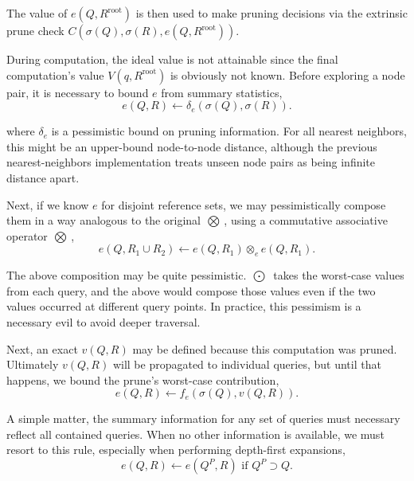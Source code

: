 \documentclass[twoside,leqno,twocolumn]{article}
\newcommand{\authornote}[1]{\footnote{Note to self: #1}}
\newcommand{\union}{\cup}
\newcommand{\summary}{\delta}
\newcommand{\kdroot}[1]{#1^{\text{root}}}
\newcommand{\kdparent}[1]{#1^{\!P}}
\newcommand{\nameOp}[2]{\mathop{#1\nolimits\!\!_{#2}}}
\newcommand{\nameop}[2]{#1_{\!#2}}
\newcommand{\myOp}[1]{\nameOp{\bigotimes}{#1}}
\newcommand{\myop}[1]{\nameop{\otimes}{#1}}
\newcommand{\letterqr}{v}
\newcommand{\outqr}{V}
\newcommand{\Opqr}{\myOp{\letterqr}}
\newcommand{\inqrv}{v}
\newcommand{\lettermu}{e}
\newcommand{\inmu}{e}
\newcommand{\Outopmu}{\nameOp{\bigodot}{\lettermu}}%
\newcommand{\Opmu}{\myOp{\lettermu}}
\newcommand{\opmu}{\myop{\lettermu}}
\newcommand{\fmuv}{f_{\lettermu}}
\newcommand{\deltamu}{\summary_{\lettermu}}
\newcommand{\canprunemu}{C}
\newcommand{\outstat}{\sigma}
\begin{document}
\noindent
The value of $\inmu(Q, \kdroot{R})$ is then used to make pruning decisions via the extrinsic prune check $\canprunemu(\outstat(Q), \outstat(R), \inmu(Q, \kdroot{R}))$.

During computation, the ideal value is not attainable since the final computation's value $\outqr(q, \kdroot{R})$ is obviously not known.
Before exploring a node pair, it is necessary to bound $\inmu$ from summary statistics,
\begin{equation}
\inmu(Q, R) \gets \deltamu(\outstat(Q), \outstat(R)).
\label{eqn:mudelta}
\end{equation}

\noindent
where $\deltamu$ is a pessimistic bound on pruning information.
For all nearest neighbors, this might be an upper-bound node-to-node distance, although the previous nearest-neighbors implementation treats unseen node pairs as being infinite distance apart.

Next, if we know $\inmu$ for disjoint reference sets, we may pessimistically compose them in a way analogous to the original $\Opqr$, using a commutative associative operator $\Opmu$,
\begin{equation}
\inmu(Q, R_1 \union R_2) \gets \inmu(Q, R_1) \opmu \inmu(Q, R_1).
\label{eqn:mucompose}
\end{equation}

\noindent
The above composition may be quite pessimistic.
$\Outopmu$ takes the worst-case values from each query, and the above would compose those values even if the two values occurred at different query points.
In practice, this pessimism is a necessary evil to avoid deeper traversal.

Next, an exact $\inqrv(Q, R)$ may be defined because this computation was pruned.
Ultimately $\inqrv(Q, R)$ will be propagated to individual queries, but until that happens, we bound the prune's worst-case contribution,
\begin{equation}
\inmu(Q, R) \gets \fmuv(\outstat(Q), \inqrv(Q, R)).
\label{eqn:muprune}
\end{equation}

\noindent
A simple matter, the summary information for any set of queries must necessary reflect all contained queries.
When no other information is available, we must resort to this rule, especially when performing depth-first expansions,
\begin{equation}
\inmu(Q, R) \gets \inmu(\kdparent{Q}, R) \text{ if } \kdparent{Q} \supset Q.
\label{eqn:muparent}
\end{equation}
\end{document}
